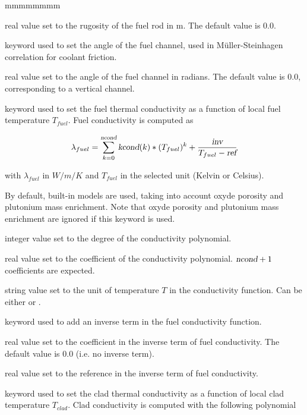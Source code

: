 \begin{ListeDeDescription}{mmmmmmmm}
\item[\dusa{epsr}] real value set to the rugosity of the fuel rod in m. The default value is 0.0.

\item[\moc{THETA}] keyword used to set the angle of the fuel channel, used in M\"uller-Steinhagen correlation for coolant friction.

\item[\dusa{theta}] real value set to the angle of the fuel channel in radians. The default value is 0.0, corresponding to a vertical channel.

\item[\moc{CONDF}] keyword used to set the fuel thermal conductivity as a function of local fuel temperature $T_{fuel}$.
Fuel conductivity is computed as

$$\lambda_{fuel} = \sum_{k=0}^{\dusa{ncond}} {\dusa{kcond}(k)*(T_{fuel})^k + \frac{\dusa{inv}}{T_{fuel}-\dusa{ref}}}$$

with $\lambda_{fuel}$ in $W/m/K$ and $T_{fuel}$ in the selected unit (Kelvin or Celsius).

By default, built-in models are used, taking into account oxyde porosity and plutonium mass enrichment.
Note that oxyde porosity and plutonium mass enrichment are ignored if this keyword is used.

\item[\dusa{ncond}] integer value set to the degree of the conductivity polynomial.

\item[\dusa{kcond}] real value set to the coefficient of the conductivity polynomial. $\dusa{ncond}+1$ coefficients are expected.

\item[\dusa{unit}] string value set to the unit of temperature $T$ in the conductivity function. Can be either  or .

\item[\moc{INV}] keyword used to add an inverse term in the fuel conductivity function.

\item[\dusa{inv}] real value set to the coefficient in the inverse term of fuel conductivity.
The default value is 0.0 (i.e. no inverse term).

\item[\dusa{ref}] real value set to the reference in the inverse term of fuel conductivity.

\item[\moc{CONDC}] keyword used to set the clad thermal conductivity as a function of local clad temperature $T_{clad}$.
Clad conductivity is computed with the following polynomial


\end{ListeDeDescription}
